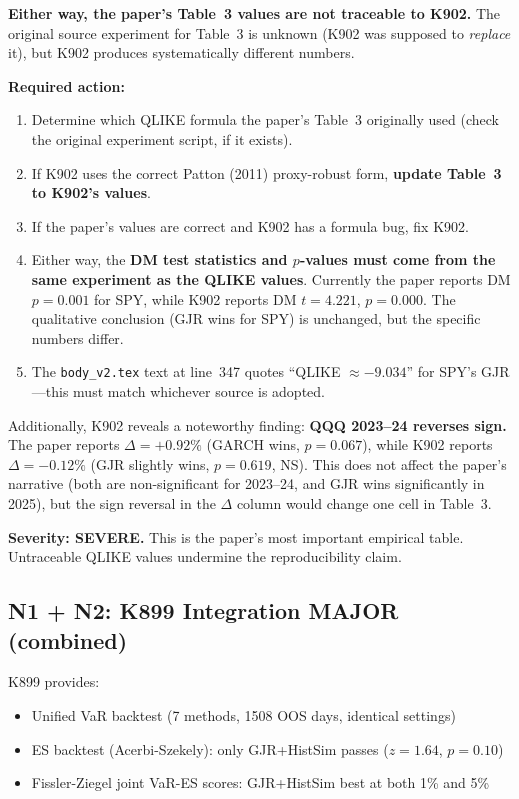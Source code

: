 \documentclass[12pt,a4paper]{article}
\begin{document}
\textbf{Either way, the paper's Table~3 values are not traceable to K902.} The original source experiment for Table~3 is unknown (K902 was supposed to \textit{replace} it), but K902 produces systematically different numbers.

\textbf{Required action:}
\begin{enumerate}[nosep]
\item Determine which QLIKE formula the paper's Table~3 originally used (check the original experiment script, if it exists).
\item If K902 uses the correct Patton (2011) proxy-robust form, \textbf{update Table~3 to K902's values}.
\item If the paper's values are correct and K902 has a formula bug, fix K902.
\item Either way, the \textbf{DM test statistics and $p$-values must come from the same experiment as the QLIKE values}. Currently the paper reports DM $p = 0.001$ for SPY, while K902 reports DM $t = 4.221$, $p = 0.000$. The qualitative conclusion (GJR wins for SPY) is unchanged, but the specific numbers differ.
\item The \texttt{body\_v2.tex} text at line~347 quotes ``QLIKE $\approx -9.034$'' for SPY's GJR---this must match whichever source is adopted.
\end{enumerate}

Additionally, K902 reveals a noteworthy finding: \textbf{QQQ 2023--24 reverses sign.} The paper reports $\Delta = +0.92\%$ (GARCH wins, $p = 0.067$), while K902 reports $\Delta = -0.12\%$ (GJR slightly wins, $p = 0.619$, NS). This does not affect the paper's narrative (both are non-significant for 2023--24, and GJR wins significantly in 2025), but the sign reversal in the $\Delta$ column would change one cell in Table~3.

\textbf{Severity: SEVERE.} This is the paper's most important empirical table. Untraceable QLIKE values undermine the reproducibility claim.


\subsection*{N1 + N2: K899 Integration \hfill \textcolor{warncolor}{MAJOR (combined)}}

K899 provides:
\begin{itemize}[nosep]
\item Unified VaR backtest (7 methods, 1508 OOS days, identical settings)
\item ES backtest (Acerbi-Szekely): only GJR+HistSim passes ($z = 1.64$, $p = 0.10$)
\item Fissler-Ziegel joint VaR-ES scores: GJR+HistSim best at both 1\% and 5\%
\end{itemize}
\end{document}
